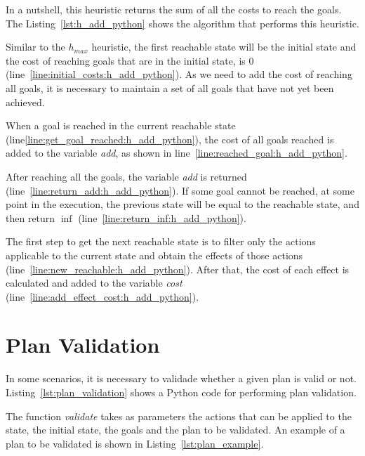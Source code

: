 \documentclass[letterpaper]{article}
\begin{document}
In a nutshell, this heuristic returns the sum of all the costs to reach the goals. The Listing~\ref{lst:h_add_python} shows the algorithm that performs this heuristic.



Similar to the $h_{max}$ heuristic, the first reachable state will be the initial state and the cost of reaching goals that are in the initial state, is $0$ (line~\ref{line:initial_costs:h_add_python}). As we need to add the cost of reaching all goals, it is necessary to maintain a set of all goals that have not yet been achieved.

When a goal is reached in the current reachable state (line\ref{line:get_goal_reached:h_add_python}), the cost of all goals reached is added to the variable \textit{add}, as shown in line~\ref{line:reached_goal:h_add_python}.

After reaching all the goals, the variable \textit{add} is returned (line~\ref{line:return_add:h_add_python}). If some goal cannot be reached, at some point in the execution, the previous state will be equal to the reachable state, and then return $\inf$ (line~\ref{line:return_inf:h_add_python}).

The first step to get the next reachable state is to filter only the actions applicable to the current state and obtain the effects of those actions (line~\ref{line:new_reachable:h_add_python}). After that, the cost of each effect is calculated and added to the variable \textit{cost} (line~\ref{line:add_effect_cost:h_add_python}).


\section{Plan Validation}

In some scenarios, it is necessary to validade whether a given plan is valid or not. Listing~\ref{lst:plan_validation} shows a Python code for performing plan validation.



The function \textit{validate} takes as parameters the actions that can be applied to the state, the initial state, the goals and the plan to be validated. An example of a plan to be validated is shown in Listing~\ref{lst:plan_example}.
\end{document}
